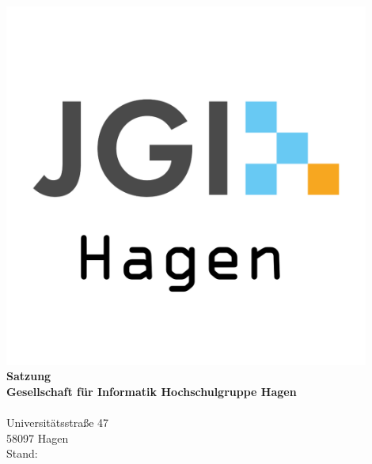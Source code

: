 \begin{titlepage}
    \thispagestyle{empty}
    \begin{center}

        \includegraphics[width=12cm]{images/Logo Hagen.png} \\
        {\Huge\textbf{Satzung}} \\
        \vspace{1.5cm}
        {\large\textbf{Gesellschaft für Informatik Hochschulgruppe Hagen}} \\ \ \\
        \textsf{
            Universitätsstraße 47\\
            58097 Hagen
        } \\

        \vspace{2cm}
        Stand: \versionDate
    \end{center}
\end{titlepage}
